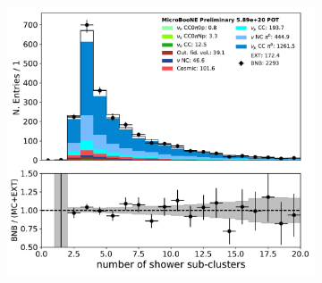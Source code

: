 \begin{figure}[H]
\begin{center}
\begin{subfigure}[b]{0.3\textwidth}
    \caption{}
    \end{subfigure}
    \begin{subfigure}[b]{0.3\textwidth}
    \centering
    \includegraphics[width=1.00\textwidth]{pi0/nueselection/subcluster_03112020_ALL_scaled.pdf}
    \caption{}
    \end{subfigure}
\caption{}
\label{fig:pi0:nueselection:trkvar2}
\end{center}
\end{figure}


